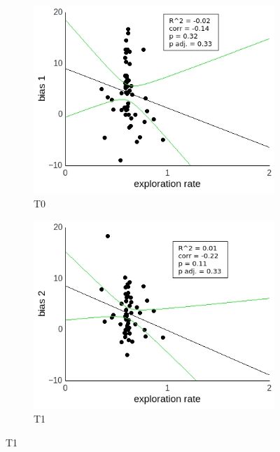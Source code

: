 \documentclass[a4paper]{scrreprt}
\begin{document}
\begin{figure}
\centering
\begin{subfigure}[b]{0.49\textwidth}
        \includegraphics[width=\textwidth]{figs/sec3/temp/tempno_diff_1_mod1mod1.jpeg}
        \caption{T0}
    \end{subfigure}
    \begin{subfigure}[b]{0.49\textwidth}
        \includegraphics[width=\textwidth]{figs/sec3/temp/tempno_diff_2_mod1mod1.jpeg}
        \caption{T1}
    \end{subfigure}


\end{figure}
\end{document}
